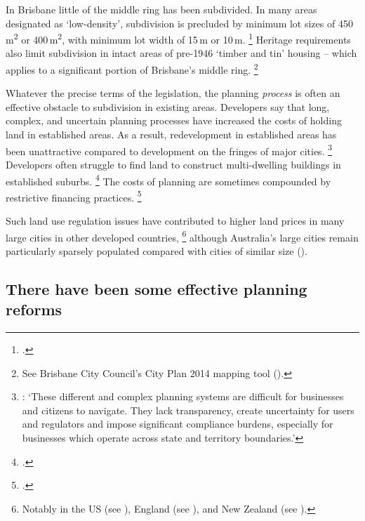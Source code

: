 In Brisbane little of the middle ring has been subdivided.
In many areas designated as `low-density', subdivision is precluded by minimum lot sizes of 450\,m\textsuperscript{2} or 400\,m\textsuperscript{2}, with minimum lot width of 15\,m or 10\,m.%
  \footcite[][Table~9.4.10.3.B]{BrisbaneCityCouncil-2014-City-Plan-Part9}
Heritage requirements also limit subdivision in intact areas of pre-1946 `timber and tin' housing -- which applies to a significant portion of Brisbane's middle ring.%
	\footnote{See Brisbane City Council's City Plan 2014 mapping tool (\textcite{BCC2018_interactive_mapping}).}

Whatever the precise terms of the legislation, the planning \emph{process} is often an effective obstacle to subdivision in existing areas.
Developers say that long, complex, and uncertain planning processes have increased the costs of holding land in established areas. As a result, redevelopment in established areas has been unattractive compared to development on the fringes of major cities.%
	\footnote{\textcites{ShooryRosewall2017}{HsiehEtAlSupply2012}[][XXVIII]{PC2011PerformanceBenchmark}: `These different and complex planning systems are difficult for businesses and citizens to navigate. They lack transparency, create uncertainty for users and regulators and impose significant compliance burdens, especially for businesses which operate across state and territory boundaries.'}
Developers often struggle to find land to construct multi-dwelling buildings in established suburbs.%
	\footcite{RowleyPhibbs2012}
The costs of planning are sometimes compounded by restrictive financing practices.%
	\footcite[][30]{KellyWeidmannWalsh2011}

Such land use regulation issues have contributed to higher land prices in many large cities in other developed countries,%
    \footnote{Notably in the
     US (see \textcite{GlaeserGyourko2003BuildRestriction}),
     England (see \textcite{Hilber-Vermeulen-2015-Supply-constraints-effect-on-English-house-prices}),
     and New Zealand (see \textcite{Lees2017LandRegulation}).}
although Australia's large cities remain particularly sparsely populated compared with cities of similar size ().

\subsection{There have been some effective planning reforms}\label{subsec:some-planning-reforms}

